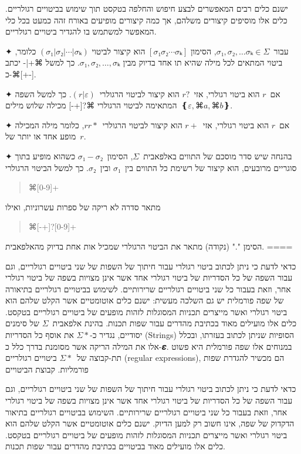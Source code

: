 ישנם כלים רבים המאפשרים לבצע חיפוש והחלפה בטקסט תוך שימוש בביטויים רגולריים.
כלים אלו מוסיפים קיצורים משלהם, אך כמה קיצורים מופיעים באורח זהה כמעט בכל כלי
המאפשר למשתמש בו להגדיר ביטויים רגולריים.

✦ עבור~$σ₁,σ₂,…σₖ∈Σ$, הסימון
$[σ₁σ₂⋯σₖ]$
הוא קיצור לביטוי
$(σ₁|σ₂|⋯|σₖ)$
כלומר, ביטוי המתאים לכל מילה שהיא תו אחד בדיוק מבין
$σ₁,σ₂,…,σₖ$.
כך למשל ⌘{+|-}
יכתב כ-⌘{[+-]}.

✦ אם~$r$ הוא ביטוי רגולרי, אזי~$r?$ הוא קיצור לביטוי הרגולרי~$(r|ε)$. כך למשל
השפה המתאימה לביטוי הרגולרי ⌘{?[+-]} מכילה שלוש מילים~$❴ε, ⌘a, ⌘b❵$.

✦ אם~$r$ הוא ביטוי רגולרי, אזי~$r+$ הוא קיצור לביטוי הרגולרי~$rr*$, כלומר מילה
המכילה מופע אחד או יותר של~$r$.

✦ בהנחה שיש סדר מוסכם של התווים באלפאבית~$Σ$, הסימון~$σ₁-σ₂$ כשהוא מופיע בתוך
סוגריים מרובעים, הוא קיצור של רשימת כל התווים בין~$σ₁$ ובין~$σ₂$.
כך למשל הביטוי הרגולרי
\begin{quote}
  ⌘{[0-9]+}
\end{quote}
מתאר סדרה לא ריקה של ספרות עשרוניות, ואילו
\begin{quote}
  ⌘{[-+]?[0-9]+}
\end{quote}
הסימן "." (נקודה) מתאר את הביטוי הרגולרי שמכיל אות אחת בדיוק מהאלפאבית.
====

כדאי לדעת כי ניתן לכתוב ביטוי רגולרי עבור חיתוך של השפות של שני ביטויים
רגולריים, וגם עבור השפה של כל הסדריות של ביטוי רגולרי אחד אשר אינן מצויות בשפה
של ביטוי רגולרי אחר, וזאת בעבור כל שני ביטויים רגולריים שרירותיים. לשימוש
בביטויים רגולריים בתיאורה של שפה פורמלית יש גם השלכה מעשית: ישנם כלים אוטומטיים
אשר הקלט שלהם הוא ביטוי רגולרי ואשר מייצרים תכניות המסוגלות לזהות
מופעים של ביטויים רגולריים בטקסט. כלים אלו מועילים מאוד בכתיבת מהדרים עבור שפות
תכנות. בהינת אלפאבית~$Σ$ של סימנים יסודיים, נגדיר כ-$Σ*$ את אוסף כל
הסדריות (Strings) הסופיות שניתן לכתוב בעזרתו, ובכלל אלו את המילה הריקה אשר
מסומנת בדרך כלל כ-𝜺. במנוחים אלו שפה פורמלית היא פשוט תת-קבוצה של~$Σ*$ ביטויים
רגולריים (regular expressions), הם מכשיר להגדרת שפות פורמליות. קבוצת הביטויים

כדאי לדעת כי ניתן לכתוב ביטוי רגולרי עבור חיתוך של השפות של שני ביטויים
רגולריים, וגם עבור השפה של כל הסדריות של ביטוי רגולרי אחד אשר אינן מצויות בשפה
של ביטוי רגולרי אחר, וזאת בעבור כל שני ביטויים רגולריים שרירותיים. השימוש
בביטויים רגולריים בתיאור הדקדוק של שפה, אינו חשוב רק למען הדיוק. ישנם כלים
אוטומטיים אשר הקלט שלהם הוא ביטוי רגולרי ואשר מייצרים תכניות המסוגלות לזהות
מופעים של ביטויים רגולריים בטקסט. כלים אלו מועילים מאוד בביטויים בכתיבת מהדרים
עבור שפות תכנות.

